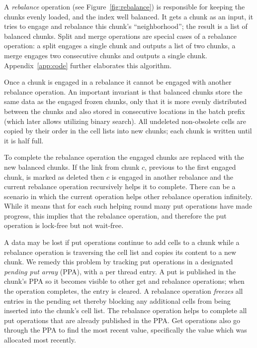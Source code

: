 A \emph{rebalance} operation (see Figure~\ref{fig:rebalance}) is responsible for keeping the chunks evenly loaded, and the index well balanced. It gets a chunk as an input, it tries to engage and rebalance this chunk's ``neighborhood''; the result is a list of balanced chunks. Split and merge operations are special cases of a rebalance operation: a split engages a single chunk and outputs a list of two chunks, a merge engages two consecutive chunks and outputs a single chunk. Appendix~\ref{app:code} further elaborates this algorithm.

Once a chunk is engaged in a rebalance it cannot be engaged with another rebalance operation. 
An important invariant is that balanced chunks store the same data as the engaged frozen chunks, only that it is more evenly distributed between the chunks and also stored in consecutive locations in the batch prefix (which later allows utilizing binary search). All undeleted non-obsolete cells are copied by their order in the cell lists into new chunks; each chunk is written until it is half full. 

To complete the rebalance operation the engaged chunks are replaced with the new balanced chunks.
If the link from chunk $c$, previous to the first engaged chunk, is marked as deleted then $c$ is engaged in another rebalance and the current rebalance operation recursively helps it to complete. There can be a scenario in which the current operation helps other rebalance operation infinitely. While it means that for each such helping round many put operations have made progress, this implies that the rebalance operation, and therefore the put operation is lock-free but not wait-free.  

A data may be lost if put operations continue to add cells to a chunk while a rebalance operation is traversing the cell list and copies its content to a new chunk. 
We remedy this problem by tracking put operations  
in a designated \emph{pending put array} (PPA), with a per thread entry. A put is published in the chunk's PPA so it becomes visible to other get and rebalance operations; when the operation completes, the entry is cleared. A rebalance operation \emph{freezes} all entries in the pending set thereby blocking any additional cells from being inserted into the chunk's cell list. 
The rebalance operation helps to complete all put operations that are already published in the PPA. Get operations also go through the PPA to find the most recent value, specifically the value which was allocated most recently. 

